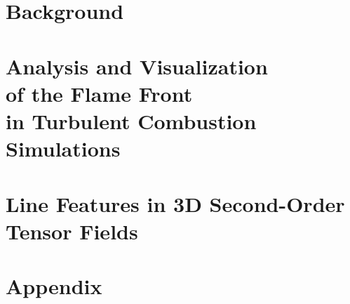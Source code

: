 
%
\part{Background} %
\label{part:background}
%

%

%
%
\part[Analysis and Visualization of the Flame Front
         in Turbulent Combustion Simulations]
        {Analysis and Visualization\\of the Flame Front\\
         in Turbulent Combustion Simulations} %
\label{part:flame_vis}
%

%

%

%
%
\part[Line Features in 3D Second-Order Tensor Fields]
    {Line Features in 3D Second-Order\\Tensor Fields} %
\label{part:tensor_vis}
%

%

%

%
%
\part{Appendix}
\label{part:appendix}
%
\appendix\appendixtrue
%

%

%